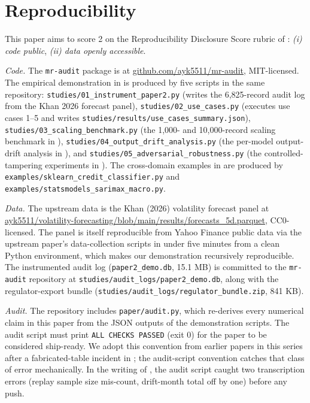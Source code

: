 \section{Reproducibility}\label{sec:reproducibility}

This paper aims to score 2 on the Reproducibility Disclosure Score rubric of \citet{Khan2026Survey}: \emph{(i) code public}, \emph{(ii) data openly accessible}.

\textit{Code.} The \texttt{mr-audit} package is at \href{https://github.com/ayk5511/mr-audit}{github.com/ayk5511/mr-audit}, MIT-licensed. The empirical demonstration in  is produced by five scripts in the same repository: \texttt{studies/01\_instrument\_paper2.py} (writes the 6,825-record audit log from the Khan 2026 forecast panel), \texttt{studies/02\_use\_cases.py} (executes use cases 1--5 and writes \texttt{studies/results/use\_cases\_summary.json}), \texttt{studies/03\_scaling\_benchmark.py} (the 1{,}000- and 10{,}000-record scaling benchmark in ), \texttt{studies/04\_output\_drift\_analysis.py} (the per-model output-drift analysis in ), and \texttt{studies/05\_adversarial\_robustness.py} (the controlled-tampering experiments in ). The cross-domain examples in  are produced by \texttt{examples/sklearn\_credit\_classifier.py} and \texttt{examples/statsmodels\_sarimax\_macro.py}.

\textit{Data.} The upstream data is the Khan (2026) volatility forecast panel at \href{https://github.com/ayk5511/volatility-forecasting/blob/main/results/forecasts_5d.parquet}{ayk5511/volatility-forecasting/blob/main/results/forecasts\_5d.parquet}, CC0-licensed. The panel is itself reproducible from Yahoo Finance public data via the upstream paper's data-collection scripts in under five minutes from a clean Python environment, which makes our demonstration recursively reproducible. The instrumented audit log (\texttt{paper2\_demo.db}, 15.1 MB) is committed to the \texttt{mr-audit} repository at \texttt{studies/audit\_logs/paper2\_demo.db}, along with the regulator-export bundle (\texttt{studies/audit\_logs/regulator\_bundle.zip}, 841 KB).

\textit{Audit.} The repository includes \texttt{paper/audit.py}, which re-derives every numerical claim in this paper from the JSON outputs of the demonstration scripts. The audit script must print \texttt{ALL CHECKS PASSED} (exit 0) for the paper to be considered ship-ready. We adopt this convention from earlier papers in this series \citep{KhanVol2026, Khan2026VolEval} after a fabricated-table incident in \citet{KhanVol2026}; the audit-script convention catches that class of error mechanically. In the writing of , the audit script caught two transcription errors (replay sample size mis-count, drift-month total off by one) before any push.

